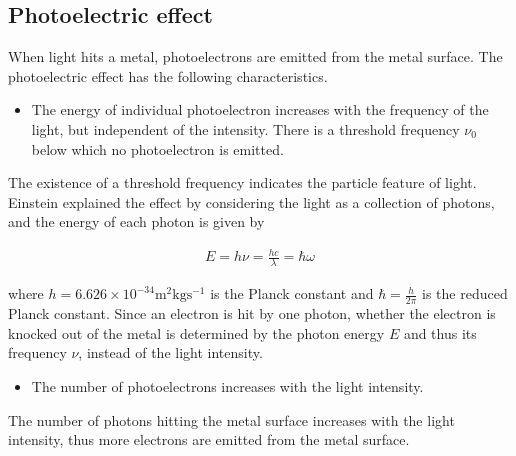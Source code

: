 \documentclass[12pt]{book} %
\numberwithin{equation}{chapter}
\def\w{\omega}
\begin{document}
\subsection*{Photoelectric effect}
When light hits a metal, photoelectrons are emitted from the metal surface. The photoelectric effect has the following characteristics.
\begin{itembox}
\begin{itemize}
\item The energy of individual photoelectron increases with the frequency of the light, but independent of the intensity. There is a threshold frequency $\nu_{0}$ below which no photoelectron is emitted.
\end{itemize}
\end{itembox}
The existence of a threshold frequency indicates the particle feature of light. Einstein explained the effect by considering the light as a collection of photons, and the energy of each photon is given by
\begin{eqnbox}
\begin{align}
E=h\nu=\frac{hc}{\lambda}=\hbar\w
\end{align}
\end{eqnbox}
where $h=6.626\times10^{-34}\text{m}^{2}\text{kg}\text{s}^{-1}$ is the Planck constant and $\hbar=\frac{h}{2\pi}$ is the reduced Planck constant. Since an electron is hit by one photon, whether the electron is knocked out of the metal is determined by the photon energy $E$ and thus its frequency $\nu$, instead of the light intensity.
\begin{itembox}
\begin{itemize}
\item The number of photoelectrons increases with the light intensity.
\end{itemize}
\end{itembox}
The number of photons hitting the metal surface increases with the light intensity, thus more electrons are emitted from the metal surface. 
\end{document}

